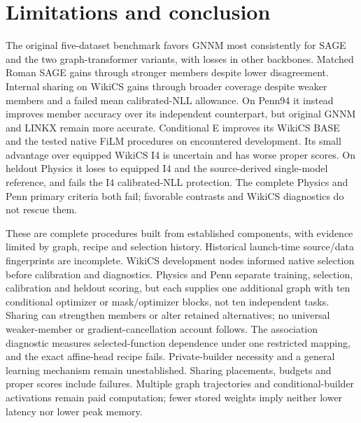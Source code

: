 \documentclass{article}
\begin{document}
\section{Limitations and conclusion}
The original five-dataset benchmark favors GNNM most consistently for SAGE and the two graph-transformer variants, with losses in other backbones. Matched Roman SAGE gains through stronger members despite lower disagreement. Internal sharing on WikiCS gains through broader coverage despite weaker members and a failed mean calibrated-NLL allowance. On Penn94 it instead improves member accuracy over its independent counterpart, but original GNNM and LINKX remain more accurate. Conditional E improves its WikiCS BASE and the tested native FiLM procedures on encountered development. Its small advantage over equipped WikiCS I4 is uncertain and has worse proper scores. On heldout Physics it loses to equipped I4 and the source-derived single-model reference, and fails the I4 calibrated-NLL protection. The complete Physics and Penn primary criteria both fail; favorable contrasts and WikiCS diagnostics do not rescue them.

These are complete procedures built from established components, with evidence limited by graph, recipe and selection history. Historical launch-time source/data fingerprints are incomplete. WikiCS development nodes informed native selection before calibration and diagnostics. Physics and Penn separate training, selection, calibration and heldout scoring, but each supplies one additional graph with ten conditional optimizer or mask/optimizer blocks, not ten independent tasks. Sharing can strengthen members or alter retained alternatives; no universal weaker-member or gradient-cancellation account follows. The association diagnostic measures selected-function dependence under one restricted mapping, and the exact affine-head recipe fails. Private-builder necessity and a general learning mechanism remain unestablished. Sharing placements, budgets and proper scores include failures. Multiple graph trajectories and conditional-builder activations remain paid computation; fewer stored weights imply neither lower latency nor lower peak memory.
\end{document}
